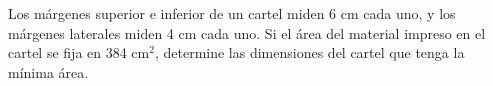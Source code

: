 \item Los márgenes superior e inferior de un cartel miden 6 cm cada uno, y los márgenes laterales miden 4 cm cada uno. Si el área del material impreso en el cartel se fija en 384 cm$^2$, determine las dimensiones del cartel que tenga la mínima área.

